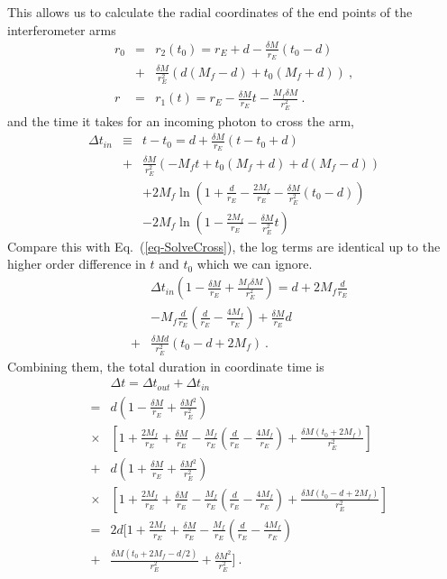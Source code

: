 \documentclass[aps,showpacs,twocolumn,floats,prd,superscriptaddress,nofootinbib]{revtex4-1}
\begin{document}
This allows us to calculate the radial coordinates of the end points of the interferometer arms 
\begin{eqnarray}
r_0 &=& r_2(t_0) = r_E +d - \frac{\delta M}{r_E}(t_0-d) \nonumber	\\
& + & \frac{\delta M}{r_E^2} (d(M_f -d) + t_0(M_f+d)) ~, \nonumber \\
r &=& r_1(t) = r_E - \frac{\delta M}{r_E}t - \frac{M_f \delta M}{r_E^2} ~.
\end{eqnarray}
and the time it takes for an incoming photon to cross the arm, 
\begin{eqnarray}
\Delta t_{in} & \equiv & t-t_0 = d + \frac{\delta M}{r_E}(t-t_0+d)	\nonumber	\\
& +& \frac{\delta M}{r_E^2} \left( - M_f t + t_0 (M_f + d) + d(M_f -d) \right)
\nonumber  \\
& & +2M_f\ln\left( 1+\frac{d}{r_E} - \frac{2M_f}{r_E} - \frac{\delta M}{r_E^2}(t_0-d) \right)
\nonumber \\ \nonumber
& & -2M_f\ln\left( 1 - \frac{2M_f}{r_E} - \frac{\delta M}{r_E^2}t \right)
\end{eqnarray}
Compare this with Eq.~(\ref{eq-SolveCross}), the log terms are identical up to the higher order difference in $t$ and $t_0$ which we can ignore.
\begin{eqnarray}
& & \Delta t_{in}\left(1-\frac{\delta M}{r_E} + \frac{M_f \delta M}{r_E^2} \right) =
d + 2M_f\frac{d}{r_E} 
\nonumber	\\
& & - M_f\frac{d}{r_E} \left( \frac{d}{r_E}-\frac{4M_f}{r_E} \right) 
+ \frac{\delta M}{r_E}d \nonumber	\\
& +&  \frac{\delta Md}{r_E^2} (t_0-d+2M_f)~.
\end{eqnarray}
Combining them, the total duration in coordinate time is
\begin{eqnarray}
& & \Delta t = \Delta t_{out} + \Delta t_{in} \nonumber \\
&=& d \left(1 - \frac{\delta M}{r_E} + \frac{\delta M^2}{r_E^2} \right) 	\nonumber	\\
& \times & \left[ 1 + \frac{2M_f}{r_E} + \frac{\delta M}{r_E} -\frac{M_f}{r_E}\left( \frac{d}{r_E}-\frac{4M_f}{r_E} \right) + \frac{\delta M (t_0+2M_f)}{r_E^2} \right] \nonumber  \\
&+& d \left(1 + \frac{\delta M}{r_E} + \frac{\delta M^2}{r_E^2} \right) \nonumber	\\
& \times & \left[ 1 + \frac{2M_f}{r_E} + \frac{\delta M}{r_E} -\frac{M_f}{r_E}\left( \frac{d}{r_E}-\frac{4M_f}{r_E} \right)  + \frac{\delta M (t_0-d+2M_f)}{r_E^2} \right]  \nonumber	\\
&=& 2d [ 1 + \frac{2M_f}{r_E} + \frac{\delta M}{r_E} -\frac{M_f}{r_E}\left( \frac{d}{r_E}-\frac{4M_f}{r_E} \right) \nonumber	\\
&+ & \frac{\delta M (t_0+2M_f-d/2)}{r_E^2} +\frac{\delta M^2}{r_E^2} ]~.
\end{eqnarray}
\end{document}
